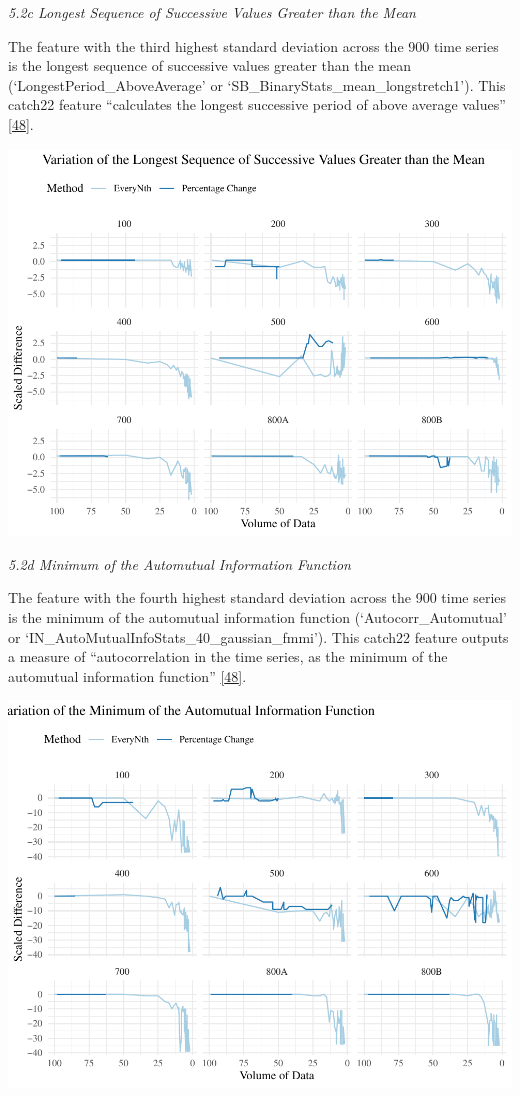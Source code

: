 \documentclass{article}
\begin{document}
\emph{5.2c Longest Sequence of Successive Values Greater than the Mean}

The feature with the third highest standard deviation across the 900
time series is the longest sequence of successive values greater than
the mean (`LongestPeriod\_AboveAverage' or
`SB\_BinaryStats\_mean\_longstretch1'). This catch22 feature
``calculates the longest successive period of above average values''
\protect\hyperlink{ref-feature_book}{{[}48{]}}.

\includegraphics{210431461_CSC8639_Dissertation_files/figure-latex/LongestGreater-1.pdf}

\emph{5.2d Minimum of the Automutual Information Function}

The feature with the fourth highest standard deviation across the 900
time series is the minimum of the automutual information function
(`Autocorr\_Automutual' or
`IN\_AutoMutualInfoStats\_40\_gaussian\_fmmi'). This catch22 feature
outputs a measure of ``autocorrelation in the time series, as the
minimum of the automutual information function''
\protect\hyperlink{ref-feature_book}{{[}48{]}}.

\includegraphics{210431461_CSC8639_Dissertation_files/figure-latex/AutoMutalFunction-1.pdf}
\end{document}
